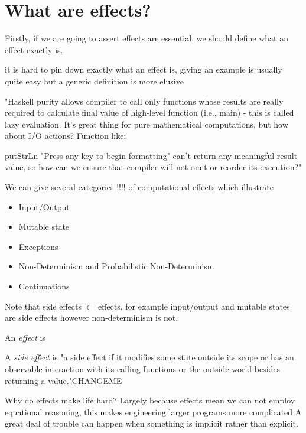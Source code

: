 \section{What are effects?}
Firstly, if we are going to assert effects are essential,
we should define what an effect exactly is.

it is hard to pin down exactly what an effect is,
giving an example is usually quite easy
but a generic definition is more elusive

"Haskell purity allows compiler to call only functions whose results are really required to calculate final value of high-level function (i.e., main) - this is called lazy evaluation. It's great thing for pure mathematical computations, but how about I/O actions? Function like:

putStrLn "Press any key to begin formatting"
can't return any meaningful result value, so how can we ensure that compiler will not omit or reorder its execution?"

\begin{example}
    We can give several categories !!!! of computational effects
    which illustrate
    \begin{itemize}
        \item Input/Output
        \item Mutable state
        \item Exceptions
        \item Non-Determinism and Probabilistic Non-Determinism
        \item Continuations
    \end{itemize}
\end{example}

Note that side effects $\subset$ effects,
for example input/output and mutable states are side effects
however non-determinism is not.
\begin{definition}
    An \textit{effect} is
\end{definition}

\begin{definition}
    A \textit{side effect} is
"a side effect if it modifies some state outside its scope or has an observable interaction with its calling functions or the outside world besides returning a value."CHANGEME
\cite{hughes1989functional}
\end{definition}

Why do effects make life hard?
Largely because effects mean we can not employ equational reasoning,
this makes engineering larger programs more complicated
A great deal of trouble can happen when something is implicit
rather than explicit.

